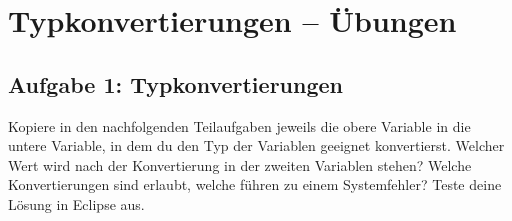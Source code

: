\clearpage

\rehead[]{\textcolor{lightblue}{AvHG, Inf, My}}
\lohead[]{\textcolor{lightblue}{AvHG, Inf, My}}

\section{Typkonvertierungen -- Übungen}

\subsection{Aufgabe 1: Typkonvertierungen}

Kopiere in den nachfolgenden Teilaufgaben jeweils die obere Variable in die
untere Variable, in dem du den Typ der Variablen geeignet konvertierst. Welcher
Wert wird nach der Konvertierung in der zweiten Variablen stehen? Welche
Konvertierungen sind erlaubt, welche führen zu einem Systemfehler? Teste deine
Lösung in Eclipse aus.

